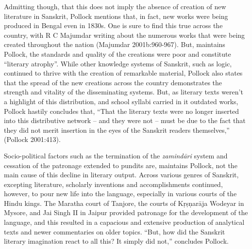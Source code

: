 Admitting though, that this does not imply the absence of creation of new literature in Sanskrit, Pollock mentions that, in fact, new works were being produced in Bengal even in 1830s. One is sure to find this true across the country, with R C Majumdar writing about the numerous works that were being created throughout the nation (Majumdar 2001b:960-967). But, maintains Pollock, the standards and quality of the creations were poor and constitute “literary atrophy”. While other knowledge systems of Sanskrit, such as logic, continued to thrive with the creation of remarkable material, Pollock also states that the spread of the new creations across the country demonstrates the strength and vitality of the disseminating systems. But, as literary texts  weren’t a highlight of this distribution, and school syllabi carried in it outdated works, Pollock hastily concludes that, “That the literary texts were no longer inserted into this distributive network – and they were not – must be due to the fact that they did not merit insertion in the eyes of the Sanskrit readers themselves,” (Pollock 2001:413).

Socio-political factors such as the termination of the {\sl zamindāri} system and cessation of the patronage extended to pundits are, maintains Pollock, not the main cause of this decline in literary output. Across various genres of Sanskrit, excepting literature, scholarly inventions and accomplishments continued, however, to pour new life into the language, especially in various courts of the Hindu kings. The Maratha court of Tanjore, the courts of Kṛṣṇarāja Wodeyar in Mysore, and Jai Singh II in Jaipur provided patronage for the development of the language, and this resulted in a capacious and extensive production of analytical texts and newer commentaries on older topics. “But, how did the Sanskrit literary imagination react to all this? It simply did not,” concludes Pollock.  

